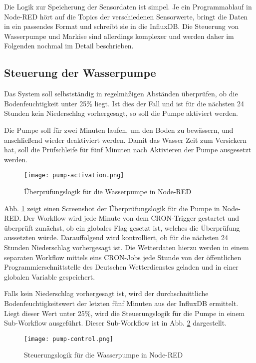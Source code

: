 Die Logik zur Speicherung der Sensordaten ist simpel. 
Je ein Programmablauf in Node-RED hört auf die Topics der verschiedenen Sensorwerte, bringt die Daten in ein passendes Format und schreibt sie in die InfluxDB.
Die Steuerung von Wasserpumpe und Markise sind allerdings komplexer und werden daher im Folgenden nochmal im Detail beschrieben.

\subsection{Steuerung der Wasserpumpe}

Das System soll selbstständig in regelmäßigen Abständen überprüfen, ob die Bodenfeuchtigkeit unter 25\% liegt.
Ist dies der Fall und ist für die nächsten 24 Stunden kein Niederschlag vorhergesagt, so soll die Pumpe aktiviert werden.

Die Pumpe soll für zwei Minuten laufen, um den Boden zu bewässern, und anschließend wieder deaktiviert werden. Damit das Wasser Zeit zum Versickern hat, soll die Prüfschleife für fünf Minuten nach Aktivieren der Pumpe ausgesetzt werden.

\begin{figure}[h]
  \centering
  \texttt{[image: pump-activation.png]}
  \caption{Überprüfungslogik für die Wasserpumpe in Node-RED}\label{fig:pump-activation}
\end{figure}

Abb. \ref{fig:pump-activation} zeigt einen Screenshot der Überprüfungslogik für die Pumpe in Node-RED.
Der Workflow wird jede Minute von dem CRON-Trigger gestartet und überprüft zunächst, ob ein globales Flag gesetzt ist, welches die Überprüfung aussetzten würde.
Darauffolgend wird kontrolliert, ob für die nächsten 24 Stunden Niederschlag vorhergesagt ist.
Die Wetterdaten hierzu werden in einem separaten Workflow mittels eins CRON-Jobs jede Stunde von der öffentlichen Programmierschnittstelle des Deutschen Wetterdienstes geladen und in einer globalen Variable gespeichert.

Falls kein Niederschlag vorhergesagt ist, wird der durchschnittliche Bodenfeuchtigkeitswert der letzten fünf Minuten aus der InfluxDB ermittelt.
Liegt dieser Wert unter 25\%, wird die Steuerungslogik für die Pumpe in einem Sub-Workflow ausgeführt.
Dieser Sub-Workflow ist in Abb. \ref{fig:pump-control} dargestellt.

\begin{figure}[h]
  \centering
  \texttt{[image: pump-control.png]}
  \caption{Steuerungslogik für die Wasserpumpe in Node-RED}\label{fig:pump-control}
\end{figure}

